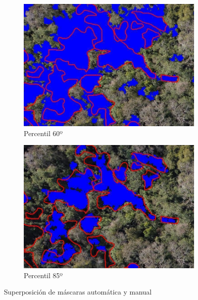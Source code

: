 \begin{figure}[h!]
     \centering
     \begin{subfigure}[b]{0.5\textwidth}
         \centering
         \includegraphics[width=\textwidth]{Imagenes/superposition of masks.png}
         \caption{Percentil 60º}
         \label{p60}
     \end{subfigure}
     \hfill
     
     \begin{subfigure}[b]{0.5\textwidth}
         \centering
         \includegraphics[width=\textwidth]{Imagenes/superposition of masks 2.png}
         \caption{Percentil 85º}
         \label{p85}
     \end{subfigure}
        \caption{Superposición de máscaras automática y manual}
        \label{superposicion}
\end{figure}

